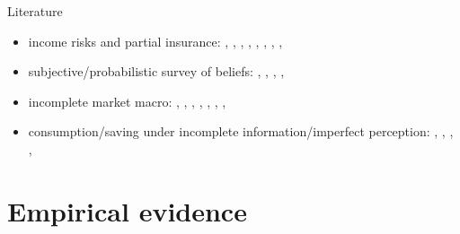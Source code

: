 \documentclass{beamer}
\begin{document}
\begin{frame}{Literature}
	\begin{itemize}
		\item income risks and partial insurance: {\scriptsize\cite{gottschalk1994growth}, \cite{carroll1997nature}, \cite{meghir2004income}, \cite{storesletten2004cyclical}, \cite{blundell_consumption_2008}, \cite{moffitt2002trends},  \cite{guvenen2014nature},  \cite{arellano2017earnings}, \cite{bloom2018great}}
		\item subjective/probabilistic survey of beliefs: {\scriptsize\cite{manski_measuring_2004}, \cite{delavande2011measuring}, \cite{manski_survey_2018},  \cite{bertrand_people_2001}, \cite{armantier_overview_2017}} 
		\item incomplete market macro: {\scriptsize\cite{bewley1976permanent}, 
		 \cite{aiyagari1994uninsured},
		\cite{huggett1996wealth}, \cite{krusell1998income}, \cite{heathcote2009quantitative},  \cite{carroll2017distribution}, \cite{krueger2016macroeconomics},  \cite{bayer2019precautionary}}
		\item consumption/saving under incomplete information/imperfect perception:  {\scriptsize\cite{pischke1995individual}, \cite{wang2004precautionary}, \cite{rozsypal_overpersistence_2017}, \cite{carroll_sticky_2018}, \cite{lian2019imperfect}}
	
	\end{itemize}
\end{frame}


\section{Empirical evidence}
\end{document}

